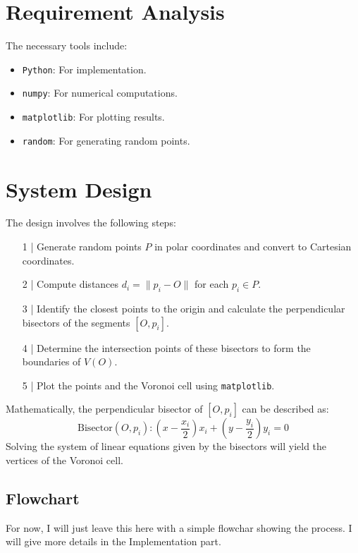 \documentclass[12pt,a4paper]{report}
\begin{document}
\section{Requirement Analysis}

The necessary tools include:
\begin{itemize}
  \item \texttt{Python}: For implementation.
  \item \texttt{numpy}: For numerical computations.
  \item \texttt{matplotlib}: For plotting results.
  \item \texttt{random}: For generating random points.
\end{itemize}

\section{System Design}

The design involves the following steps:

\begin{itemize}

\item[1 |]  Generate random points \( P \) in polar coordinates and convert to Cartesian coordinates.
\item[2 |] Compute distances \( d_i = \|p_i - O\| \) for each \( p_i \in P \).
\item[3 |] Identify the closest points to the origin and calculate the perpendicular bisectors of the segments \( [O, p_i] \).
\item[4 |] Determine the intersection points of these bisectors to form the boundaries of \( V(O) \).
\item[5 |] Plot the points and the Voronoi cell using \texttt{matplotlib}.
\end{itemize}


Mathematically, the perpendicular bisector of \( [O, p_i] \) can be described as:
\[
\text{Bisector}(O, p_i): (x - \frac{x_i}{2}) x_i + (y - \frac{y_i}{2}) y_i = 0
\]
Solving the system of linear equations given by the bisectors will yield the vertices of the Voronoi cell.


\subsection{Flowchart}

For now, I will just leave this here with a simple flowchar showing the process. I will give more details in the Implementation part.
\end{document}
